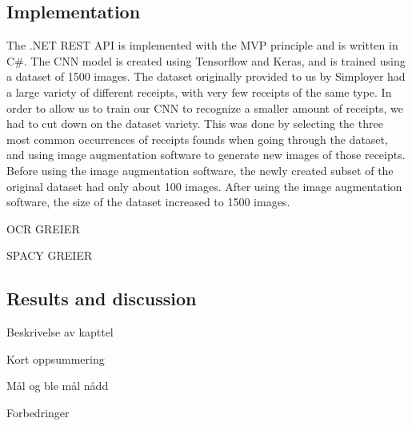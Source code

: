 \subsection{Implementation}\label{implementation}
The .NET REST API is implemented with the MVP principle and is written in C\#.
The CNN model is created using Tensorflow and Keras, and is trained using a dataset of 1500 images.
The dataset originally provided to us by Simployer had a large variety of different receipts, with very few receipts of the same type.
In order to allow us to train our CNN to recognize a smaller amount of receipts, we had to cut down on the dataset variety.
This was done by selecting the three most common occurrences of receipts founds when going through the dataset, and using image augmentation software to generate new images of those receipts.
Before using the image augmentation software, the newly created subset of the original dataset had only about 100 images.
After using the image augmentation software, the size of the dataset increased to 1500 images.

OCR GREIER

SPACY GREIER

\subsection{Results and discussion}\label{resultsanddiscussion}


Beskrivelse av kapttel

Kort oppsummering

Mål og ble mål nådd

Forbedringer
